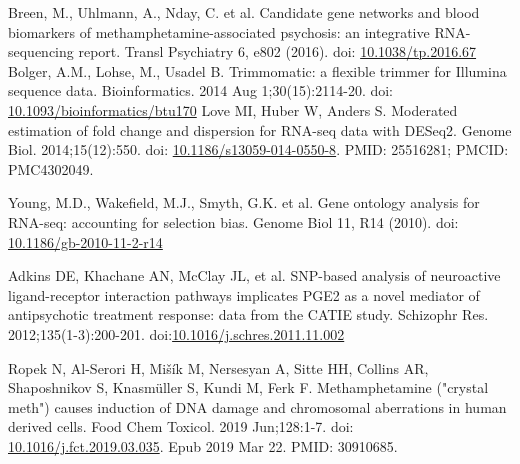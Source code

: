 \documentclass[a4paper,12pt]{article}
\begin{document}
\newpage
\begin{thebibliography}{99}
     Breen, M., Uhlmann, A., Nday, C. et al. Candidate gene networks and blood biomarkers of methamphetamine-associated psychosis: an integrative RNA-sequencing report. Transl Psychiatry 6, e802 (2016). doi: \href{https://doi.org/10.1038/tp.2016.67}{10.1038/tp.2016.67}
     Bolger, A.M., Lohse, M., Usadel B. Trimmomatic: a flexible trimmer for Illumina sequence data. Bioinformatics. 2014 Aug 1;30(15):2114-20. doi: \href{https://doi.org/10.1093/bioinformatics/btu170}{10.1093/bioinformatics/btu170}
     Love MI, Huber W, Anders S. Moderated estimation of fold change and dispersion for RNA-seq data with DESeq2. Genome Biol. 2014;15(12):550. doi:
    \href{https://doi.org/10.1186/s13059-014-0550-8}{10.1186/s13059-014-0550-8}. PMID: 25516281; PMCID: PMC4302049.

     Young, M.D., Wakefield, M.J., Smyth, G.K. et al. Gene ontology analysis for RNA-seq: accounting for selection bias. Genome Biol 11, R14 (2010).
    doi: \href{https://doi.org/10.1186/gb-2010-11-2-r14}{10.1186/gb-2010-11-2-r14}

     Adkins DE, Khachane AN, McClay JL, et al. SNP-based analysis of neuroactive ligand-receptor interaction pathways implicates PGE2 as a novel mediator of antipsychotic treatment response: data from the CATIE study. Schizophr Res. 2012;135(1-3):200-201. doi:\href{https://doi.org/10.1016/j.schres.2011.11.002}{10.1016/j.schres.2011.11.002}

     Ropek N, Al-Serori H, Mišík M, Nersesyan A, Sitte HH, Collins AR, Shaposhnikov S, Knasmüller S, Kundi M, Ferk F. Methamphetamine ("crystal meth") causes induction of DNA damage and chromosomal aberrations in human derived cells. Food Chem Toxicol. 2019 Jun;128:1-7. doi: \href{https://doi.org/10.1016/j.fct.2019.03.035}{10.1016/j.fct.2019.03.035}. Epub 2019 Mar 22. PMID: 30910685.

\end{thebibliography}

\newpage

\end{document}
